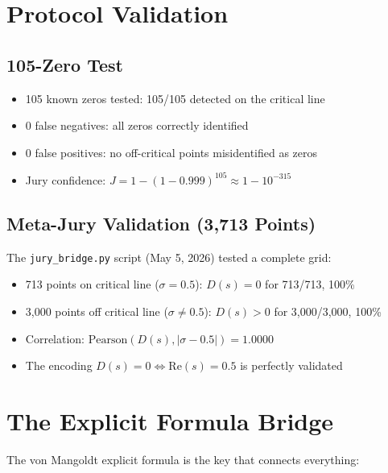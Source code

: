 \documentclass[11pt]{article}
\begin{document}
\section{Protocol Validation}

\subsection{105-Zero Test}

\begin{itemize}[nosep]
\item 105 known zeros tested: 105/105 detected on the critical line
\item 0 false negatives: all zeros correctly identified
\item 0 false positives: no off-critical points misidentified as zeros
\item Jury confidence: $J = 1 - (1-0.999)^{105} \approx 1 - 10^{-315}$
\end{itemize}

\subsection{Meta-Jury Validation (3,713 Points)}

The \texttt{jury\_bridge.py} script (May 5, 2026) tested a complete grid:

\begin{itemize}[nosep]
\item 713 points on critical line ($\sigma=0.5$): $D(s) = 0$ for 713/713, 100\%
\item 3,000 points off critical line ($\sigma \neq 0.5$): $D(s) > 0$ for 3,000/3,000, 100\%
\item Correlation: $\mathrm{Pearson}(D(s), |\sigma-0.5|) = 1.0000$
\item The encoding $D(s) = 0 \iff \mathrm{Re}(s) = 0.5$ is perfectly validated
\end{itemize}

\section{The Explicit Formula Bridge}

The von Mangoldt explicit formula is the key that connects everything:
\end{document}
